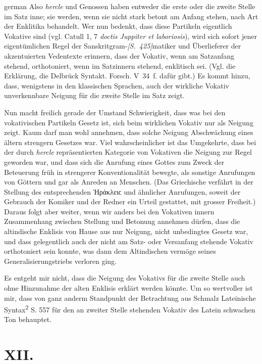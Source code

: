\begin{otherlanguage*}{german}
Also \emph{hercle} und Genossen haben entweder die erste oder die zweite Stelle im Satz inne; sie werden, wenn sie nicht stark betont am Anfang stehen, nach Art der Enklitika behandelt. Wer nun bedenkt, dass diese Partikeln eigentlich Vokative sind (vgl. Catull 1, 7 \emph{doctis Juppiter et laboriosis}), wird sich sofort jener eigentümlichen Regel der Sanskritgram-\hypertarget{p425}{\emph{[S.~425]}}\label{p425}matiker und Überlieferer der akzentuierten Vedentexte erinnern, dass der Vokativ, wenn am Satzanfang stehend, orthotoniert, wenn im Satzinnern stehend, enklitisch sei. (Vgl. die Erklärung, die Delbrück Syntakt. Forsch. V~34~f. dafür gibt.) Es kommt hinzu, dass, wenigstens in den klassischen Sprachen, auch der wirkliche Vokativ unverkennbare Neigung für die zweite Stelle im Satz zeigt.

Nun macht freilich gerade der Umstand Schwierigkeit, dass was bei den vokativischen Partikeln Gesetz ist, sich beim wirklichen Vokativ nur als Neigung zeigt. Kaum darf man wohl annehmen, dass solche Neigung Abschwächung eines ältern strengern Gesetzes war. Viel wahrscheinlicher ist das Umgekehrte, dass bei der durch \emph{hercle} repräsentierten Kategorie von Vokativen die Neigung zur Regel geworden war, und dass sich die Anrufung eines Gottes zum Zweck der Beteuerung früh in strengerer Konventionalität bewegte, als sonstige Anrufungen von Göttern und gar als Anreden an Menschen. (Das Griechische verfährt in der Stellung des entsprechenden Ἡράκλειϲ und ähnlicher Anrufungen, soweit der Gebrauch der Komiker und der Redner ein Urteil gestattet, mit gros\-ser Freiheit.) Daraus folgt aber weiter, wenn wir anders bei den Vokativen innern Zusammenhang zwischen Stellung und Betonung annehmen dürfen, dass die altindische Enklisis von Hause aus nur Neigung, nicht unbedingtes Gesetz war, und dass gelegentlich auch der nicht am Satz- oder Versanfang stehende Vokativ orthotoniert sein konnte, was dann dem Altindischen vermöge seines Generalisierungstriebs verloren ging.

Es entgeht mir nicht, dass die Neigung des Vokativs für die zweite Stelle auch ohne Hinzunahme der alten Enklisis erklärt werden könnte. Um so wertvoller ist mir, dass von ganz anderm Standpunkt der Betrachtung aus Schmalz Lateinische Syntax\textsuperscript{2} S. 557 für den an zweiter Stelle stehenden Vokativ des Latein schwachen Ton behauptet.

\section*{XII.}


\end{otherlanguage*}

